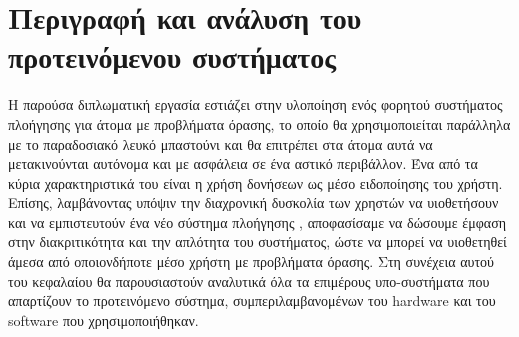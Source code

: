 \chapter{Περιγραφή και ανάλυση του προτεινόμενου συστήματος}\label{ch:system-architecture}

Η παρούσα διπλωματική εργασία εστιάζει στην υλοποίηση ενός φορητού συστήματος πλοήγησης για άτομα με προβλήματα όρασης, το οποίο θα χρησιμοποιείται παράλληλα με το παραδοσιακό λευκό μπαστούνι και θα επιτρέπει στα άτομα αυτά να μετακινούνται αυτόνομα και με ασφάλεια σε ένα αστικό περιβάλλον. Ένα από τα κύρια χαρακτηριστικά του είναι η χρήση δονήσεων ως μέσο ειδοποίησης του χρήστη. Επίσης, λαμβάνοντας υπόψιν την διαχρονική δυσκολία των χρηστών να υιοθετήσουν και να εμπιστευτούν ένα νέο σύστημα πλοήγησης \cite{giudice2018navigating, giudice2008blind}, αποφασίσαμε να δώσουμε έμφαση στην διακριτικότητα και την απλότητα του συστήματος, ώστε να μπορεί να υιοθετηθεί άμεσα από οποιονδήποτε μέσο χρήστη με προβλήματα όρασης. Στη συνέχεια αυτού του κεφαλαίου θα παρουσιαστούν αναλυτικά όλα τα επιμέρους υπο-συστήματα που απαρτίζουν το προτεινόμενο σύστημα, συμπεριλαμβανομένων του hardware και του software που χρησιμοποιήθηκαν.

